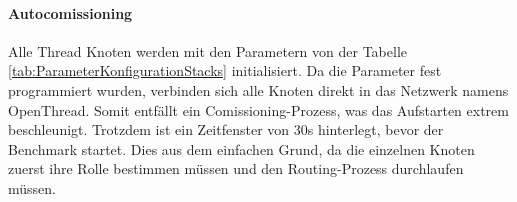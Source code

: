 \begin{table}[h]
	\caption{Parameter zu Konfiguration des Stacks}
	\label{tab:ParameterKonfigurationStacks}
\end{table}

\paragraph{Autocomissioning}
Alle Thread Knoten werden mit den Parametern von der Tabelle \ref{tab:ParameterKonfigurationStacks} initialisiert. Da die Parameter fest programmiert wurden, verbinden sich alle Knoten direkt in das Netzwerk namens OpenThread. Somit entfällt ein Comissioning-Prozess, was das Aufstarten extrem beschleunigt. Trotzdem ist ein Zeitfenster von 30s hinterlegt, bevor der Benchmark startet. Dies aus dem einfachen Grund, da die einzelnen Knoten zuerst ihre Rolle bestimmen müssen und den Routing-Prozess durchlaufen müssen.

